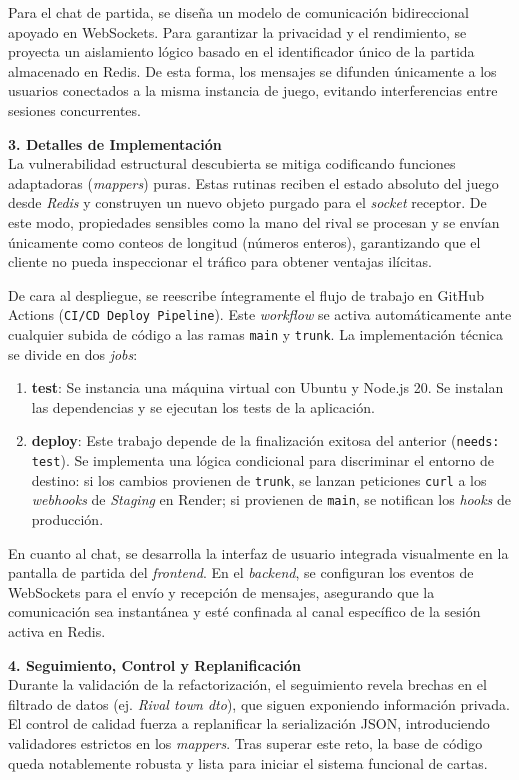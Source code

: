 Para el chat de partida, se diseña un modelo de comunicación bidireccional apoyado en WebSockets. Para garantizar la privacidad y el rendimiento, se proyecta un aislamiento lógico basado en el identificador único de la partida almacenado en Redis. De esta forma, los mensajes se difunden únicamente a los usuarios conectados a la misma instancia de juego, evitando interferencias entre sesiones concurrentes.


\textbf{3. Detalles de Implementación} \\
La vulnerabilidad estructural descubierta se mitiga codificando funciones adaptadoras (\textit{mappers}) puras. Estas rutinas reciben el estado absoluto del juego desde \textit{Redis} y construyen un nuevo objeto purgado para el \textit{socket} receptor. De este modo, propiedades sensibles como la mano del rival se procesan y se envían únicamente como conteos de longitud (números enteros), garantizando que el cliente no pueda inspeccionar el tráfico para obtener ventajas ilícitas.

De cara al despliegue, se reescribe íntegramente el flujo de trabajo en GitHub Actions (\texttt{CI/CD Deploy Pipeline}). Este \textit{workflow} se activa automáticamente ante cualquier subida de código a las ramas \texttt{main} y \texttt{trunk}. La implementación técnica se divide en dos \textit{jobs}:

\begin{enumerate}
    \item \textbf{test}: Se instancia una máquina virtual con Ubuntu y Node.js 20. Se instalan las dependencias y se ejecutan los tests de la aplicación.
    \item \textbf{deploy}: Este trabajo depende de la finalización exitosa del anterior (\texttt{needs: test}). Se implementa una lógica condicional para discriminar el entorno de destino: si los cambios provienen de \texttt{trunk}, se lanzan peticiones \texttt{curl} a los \textit{webhooks} de \textit{Staging} en Render; si provienen de \texttt{main}, se notifican los \textit{hooks} de producción.
\end{enumerate}

En cuanto al chat, se desarrolla la interfaz de usuario integrada visualmente en la pantalla de partida del \textit{frontend}. En el \textit{backend}, se configuran los eventos de WebSockets para el envío y recepción de mensajes, asegurando que la comunicación sea instantánea y esté confinada al canal específico de la sesión activa en Redis.

\textbf{4. Seguimiento, Control y Replanificación} \\
Durante la validación de la refactorización, el seguimiento revela brechas en el filtrado de datos (ej. \textit{Rival town dto}), que siguen exponiendo información privada. El control de calidad fuerza a replanificar la serialización JSON, introduciendo validadores estrictos en los \textit{mappers}. Tras superar este reto, la base de código queda notablemente robusta y lista para iniciar el sistema funcional de cartas.

